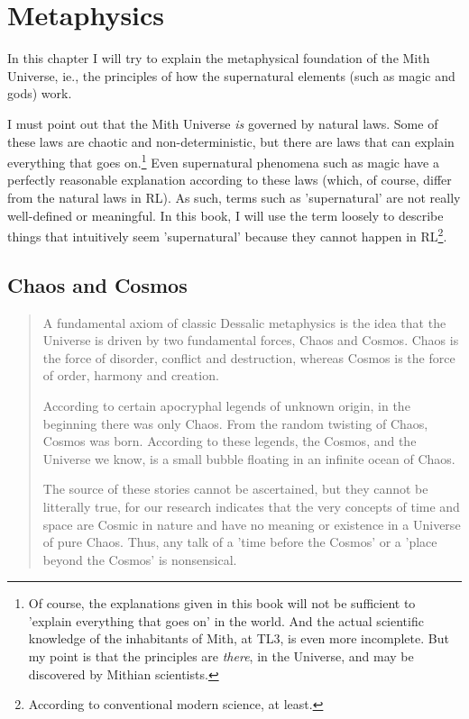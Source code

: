 \chapter{Metaphysics}

In this chapter I will try to explain the metaphysical foundation of the Mith Universe, ie., the principles of how the supernatural elements (such as magic and gods) work. 

I must point out that the Mith Universe \emph{is} governed by natural laws. Some of these laws are chaotic and non-deterministic, but there are laws that can explain everything that goes on.\footnote{Of course, the explanations given in this book will not be sufficient to 'explain everything that goes on' in the world. And the actual scientific knowledge of the inhabitants of Mith, at TL3, is even more incomplete. But my point is that the principles are \emph{there}, in the Universe, and may be discovered by Mithian scientists.} Even supernatural phenomena such as magic have a perfectly reasonable explanation according to these laws (which, of course, differ from the natural laws in RL). As such, terms such as 'supernatural' are not really well-defined or meaningful. In this book, I will use the term loosely to describe things that intuitively seem 'supernatural' because they cannot happen in RL\footnote{According to conventional modern science, at least.}. 

\section{Chaos and Cosmos}

\begin{quote}
A fundamental axiom of classic Dessalic metaphysics is the idea that the Universe is driven by two fundamental forces, Chaos and Cosmos. Chaos is the force of disorder, conflict and destruction, whereas Cosmos is the force of order, harmony and creation. 

According to certain apocryphal legends of unknown origin, in the beginning there was only Chaos. From the random twisting of Chaos, Cosmos was born. According to these legends, the Cosmos, and the Universe we know, is a small bubble floating in an infinite ocean of Chaos. 

The source of these stories cannot be ascertained, but they cannot be litterally true, for our research indicates that the very concepts of time and space are Cosmic in nature and have no meaning or existence in a Universe of pure Chaos. Thus, any talk of a 'time before the Cosmos' or a 'place beyond the Cosmos' is nonsensical. 
\end{quote}




